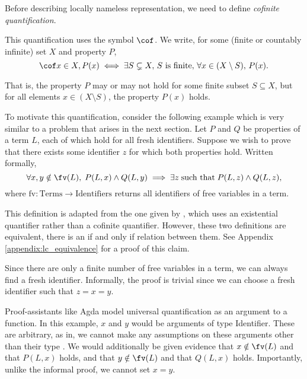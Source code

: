 Before describing locally nameless representation, we need to define \textit{cofinite
quantification}.

This quantification uses the symbol $\cof$. We write, for some (finite or countably infinite) set $X$ and property $P$,
\begin{equation}
  \label{equation:cofinite}
  \cof x \in X, P(x) \iff
  \exists S \subsetneq X, \, S \text{ is finite}, \, \forall x \in (X \setminus S), \, P(x).
\end{equation}

That is, the property $P$ may or may not hold for some finite subset $S \subseteq X$, but for all
elements $x \in (X \setminus S)$, the property $P(x)$ holds.

To motivate this quantification, consider the following example which is very similar to a problem
that arises in the next section. Let $P$ and $Q$ be properties of a term $L$, each of which hold for
all fresh identifiers. Suppose we wish to prove that there exists some identifier $z$ for which both
properties hold. Written formally,
\begin{equation*}
  \forall x, y \notin \fv(L), \; P(L, x) \wedge Q(L, y)
  \implies \exists z \; \text{such that} \; P(L, z) \wedge Q(L, z),
\end{equation*}
where $\text{fv} \colon \text{Terms} \to \text{Identifiers}$ returns all identifiers of free
variables in a term.

This definition is adapted from the one given by \citet{pitts_locally_2023}, which uses an
existential quantifier rather than a cofinite quantifier. However, these two definitions are
equivalent, there is an if and only if relation between them. See Appendix
\ref{appendix:lc_equivalence} for a proof of this claim.

Since there are only a finite number of free variables in a term, we can always find a fresh
identifier. Informally, the proof is trivial since we can choose a fresh identifier such that $z = x
= y$.

Proof-assistants like Agda model universal quantification as an argument to a function. In this
example, $x$ and $y$ would be arguments of type Identifier. These are arbitrary, as in, we cannot
make any assumptions on these arguments other than their type
\citep[chapter~Quantifier]{wadler_programming_2022}. We would additionally be given evidence that $x
\notin \fv(L)$ and that $P(L, x)$ holds, and that $y \notin \fv(L)$ and that $Q(L, x)$ holds.
Importantly, unlike the informal proof, we cannot set $x = y$.

